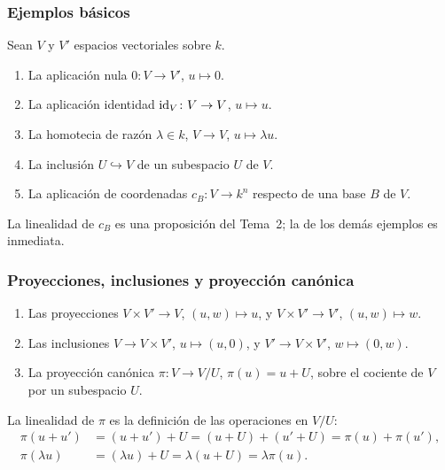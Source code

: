 \begin{frame}
    \frametitle{Ejemplos básicos}

    \begin{example}
        Sean $V$ y $V'$ espacios vectoriales sobre $k$.
        \begin{enumerate}
            \item La aplicación \alert{nula} $0\colon V\to V'$,
            $u\mapsto 0$.
            \item La aplicación \alert{identidad}
            $\operatorname{id}_V\colon V\to V$, $u\mapsto u$.
            \item La \alert{homotecia} de razón $\lambda\in k$,
            $V\to V$, $u\mapsto\lambda u$.
            \item La \alert{inclusión} $U\hookrightarrow V$ de un
            subespacio $U$ de $V$.
            \item La aplicación de coordenadas
            $c_B\colon V\to k^n$ respecto de una base $B$ de $V$.
        \end{enumerate}
    \end{example}

    La linealidad de $c_B$ es una proposición del Tema~2; la de los demás
    ejemplos es inmediata.
\end{frame}


\begin{frame}
    \frametitle{Proyecciones, inclusiones y proyección canónica}

    \begin{example}
        \begin{enumerate}
            \item Las \alert{proyecciones}
            $V\times V'\to V$, $(u,w)\mapsto u$, y
            $V\times V'\to V'$, $(u,w)\mapsto w$.
            \item Las \alert{inclusiones}
            $V\to V\times V'$, $u\mapsto(u,0)$, y
            $V'\to V\times V'$, $w\mapsto(0,w)$.
            \item La \alert{proyección canónica}
            $\pi\colon V\to V/U$, $\pi(u)=u+U$, sobre el cociente de $V$
            por un subespacio $U$.
        \end{enumerate}
    \end{example}

    La linealidad de $\pi$ es la definición de las operaciones en $V/U$:
    \begin{align*}
        \pi(u+u')&=(u+u')+U=(u+U)+(u'+U)=\pi(u)+\pi(u'),
        \\
        \pi(\lambda u)&=(\lambda u)+U=\lambda(u+U)=\lambda\pi(u).
    \end{align*}
\end{frame}


